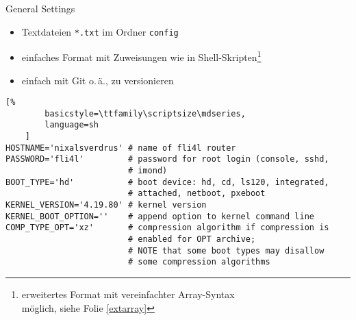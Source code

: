 \documentclass[t]{beamer}
\begin{document}
\begin{frame}[fragile]{General Settings}
    \begin{itemize}
        \item Textdateien \texttt{*.txt} im Ordner \texttt{config}
        \item einfaches Format mit Zuweisungen wie in
            Shell-Skripten\footnote{erweitertes Format mit vereinfachter
            Array-Syntax\\möglich, siehe Folie \ref{extarray}}
        \item einfach mit Git o.\,ä., zu versionieren
    \end{itemize}

    \begin{lstlisting}[%
        basicstyle=\ttfamily\scriptsize\mdseries,
        language=sh
    ]
HOSTNAME='nixalsverdrus' # name of fli4l router
PASSWORD='fli4l'         # password for root login (console, sshd,
                         # imond)
BOOT_TYPE='hd'           # boot device: hd, cd, ls120, integrated,
                         # attached, netboot, pxeboot
KERNEL_VERSION='4.19.80' # kernel version
KERNEL_BOOT_OPTION=''    # append option to kernel command line
COMP_TYPE_OPT='xz'       # compression algorithm if compression is
                         # enabled for OPT archive;
                         # NOTE that some boot types may disallow
                         # some compression algorithms
    \end{lstlisting}
\end{frame}
\end{document}
